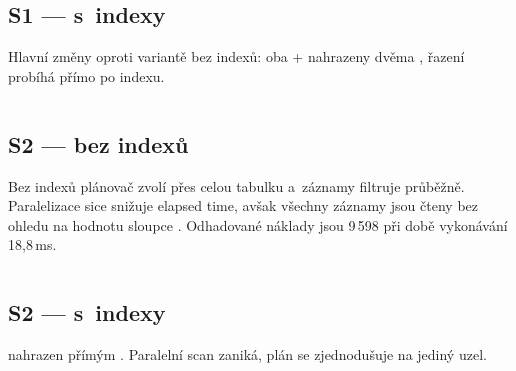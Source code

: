 \begin{longlisting}
  \caption{S1: EXPLAIN ANALYZE bez indexů (Execution Time: 73,5 ms)}
  \label{lst:appendix:explain:s1:no_idx}
  \inputminted[fontsize=\footnotesize]{text}{./code/sql/explain_q1_no_idx.txt}
\end{longlisting}

\subsection*{S1 --- s~indexy}

Hlavní změny oproti variantě bez indexů: oba  +  nahrazeny dvěma , řazení probíhá přímo po indexu.

\begin{longlisting}
  \caption{S1: EXPLAIN ANALYZE s~indexy (Execution Time: 20,0 ms)}
  \label{lst:appendix:explain:s1:idx}
  \inputminted[fontsize=\footnotesize]{text}{./code/sql/explain_q1_idx.txt}
\end{longlisting}

\subsection*{S2 --- bez indexů}

Bez indexů plánovač zvolí  přes celou tabulku  a~záznamy filtruje průběžně. Paralelizace sice snižuje elapsed time, avšak všechny záznamy jsou čteny bez ohledu na hodnotu sloupce . Odhadované náklady jsou 9\,598 při době vykonávání 18,8\,ms.

\begin{longlisting}
  \caption{S2: EXPLAIN ANALYZE bez indexů (Execution Time: 18,8 ms)}
  \label{lst:appendix:explain:s2:no_idx}
  \inputminted[fontsize=\footnotesize]{text}{./code/sql/explain_q2_no_idx.txt}
\end{longlisting}

\subsection*{S2 --- s~indexy}

 nahrazen přímým . Paralelní scan zaniká, plán se zjednodušuje na jediný uzel.

\begin{longlisting}
  \caption{S2: EXPLAIN ANALYZE s~indexy (Execution Time: 2,7 ms)}
  \label{lst:appendix:explain:s2:idx}
  \inputminted[fontsize=\footnotesize]{text}{./code/sql/explain_q2_idx.txt}
\end{longlisting}

